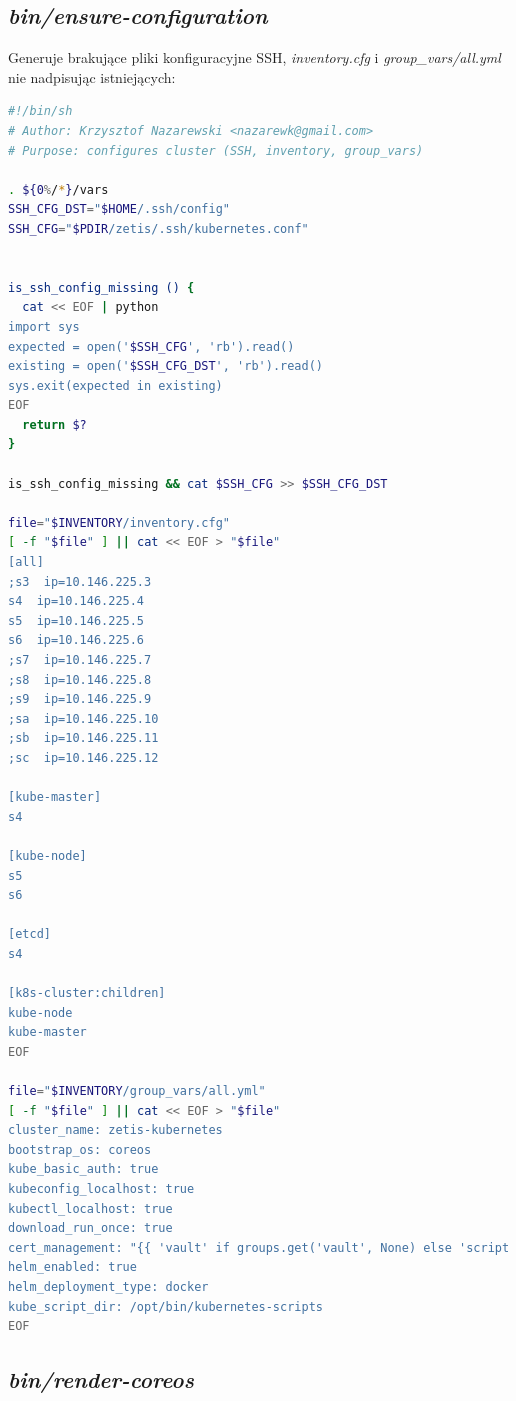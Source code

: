 \documentclass[a4paper,12pt,twoside,openany]{report}
\begin{document}
\newpage

\hypertarget{binensure-configuration}{%
\subsection{\texorpdfstring{\emph{bin/ensure-configuration}}{bin/ensure-configuration}}\label{binensure-configuration}}

Generuje brakujące pliki konfiguracyjne SSH, \emph{inventory.cfg} i
\emph{group\_vars/all.yml} nie nadpisując istniejących:

\begin{lstlisting}[language=bash]
#!/bin/sh
# Author: Krzysztof Nazarewski <nazarewk@gmail.com>
# Purpose: configures cluster (SSH, inventory, group_vars)

. ${0%/*}/vars
SSH_CFG_DST="$HOME/.ssh/config"
SSH_CFG="$PDIR/zetis/.ssh/kubernetes.conf"


is_ssh_config_missing () {
  cat << EOF | python
import sys
expected = open('$SSH_CFG', 'rb').read()
existing = open('$SSH_CFG_DST', 'rb').read()
sys.exit(expected in existing)
EOF
  return $?
}

is_ssh_config_missing && cat $SSH_CFG >> $SSH_CFG_DST

file="$INVENTORY/inventory.cfg"
[ -f "$file" ] || cat << EOF > "$file"
[all]
;s3  ip=10.146.225.3
s4  ip=10.146.225.4
s5  ip=10.146.225.5
s6  ip=10.146.225.6
;s7  ip=10.146.225.7
;s8  ip=10.146.225.8
;s9  ip=10.146.225.9
;sa  ip=10.146.225.10
;sb  ip=10.146.225.11
;sc  ip=10.146.225.12

[kube-master]
s4

[kube-node]
s5
s6

[etcd]
s4

[k8s-cluster:children]
kube-node
kube-master
EOF

file="$INVENTORY/group_vars/all.yml"
[ -f "$file" ] || cat << EOF > "$file"
cluster_name: zetis-kubernetes
bootstrap_os: coreos
kube_basic_auth: true
kubeconfig_localhost: true
kubectl_localhost: true
download_run_once: true
cert_management: "{{ 'vault' if groups.get('vault', None) else 'script' }}"
helm_enabled: true
helm_deployment_type: docker
kube_script_dir: /opt/bin/kubernetes-scripts
EOF
\end{lstlisting}

\newpage

\hypertarget{binrender-coreos}{%
\subsection{\texorpdfstring{\emph{bin/render-coreos}}{bin/render-coreos}}\label{binrender-coreos}}
\end{document}
